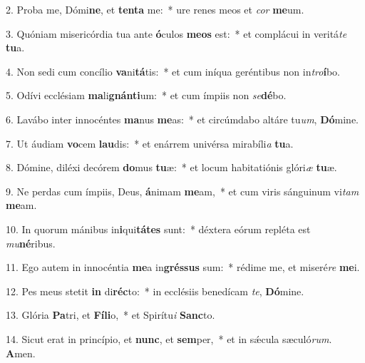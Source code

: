 2. Proba me, Dómi\textbf{ne}, et \textbf{ten}\textbf{ta} me:~*  ure renes meos et \textit{cor} \textbf{me}um.\

3. Quóniam misericórdia tua ante \textbf{ó}culos \textbf{me}\textbf{os} est:~*  et complácui in veritá\textit{te} \textbf{tu}a.\

4. Non sedi cum concílio \textbf{va}ni\textbf{tá}tis:~*  et cum iníqua geréntibus non in\textit{tro}\textbf{í}bo.\

5. Odívi ecclésiam \textbf{ma}li\textbf{gnán}\textbf{ti}um:~*  et cum ímpiis non \textit{se}\textbf{dé}bo.\

6. Lavábo inter innocéntes \textbf{ma}nus \textbf{me}as:~*  et circúmdabo altáre tu\textit{um}, \textbf{Dó}mine.\

7. Ut áudiam \textbf{vo}cem \textbf{lau}dis:~*  et enárrem univérsa mirabíli\textit{a} \textbf{tu}a.\

8. Dómine, diléxi decórem \textbf{do}mus \textbf{tu}æ:~*  et locum habitatiónis glóri\textit{æ} \textbf{tu}æ.\

9. Ne perdas cum ímpiis, Deus, \textbf{á}nimam \textbf{me}am,~*  et cum viris sánguinum vi\textit{tam} \textbf{me}am.\

10. In quorum mánibus in\textbf{i}qui\textbf{tá}\textbf{tes} sunt:~*  déxtera eórum repléta est \textit{mu}\textbf{né}ribus.\

11. Ego autem in innocéntia \textbf{me}a in\textbf{grés}\textbf{sus} sum:~*  rédime me, et miseré\textit{re} \textbf{me}i.\

12. Pes meus stetit \textbf{in} di\textbf{réc}to:~*  in ecclésiis benedícam \textit{te}, \textbf{Dó}mine.\

13. Glória \textbf{Pa}tri, et \textbf{Fí}\textbf{li}o,~*  et Spirítu\textit{i} \textbf{Sanc}to.\

14. Sicut erat in princípio, et \textbf{nunc}, et \textbf{sem}per,~*  et in sǽcula sæculó\textit{rum}. \textbf{A}men.\

